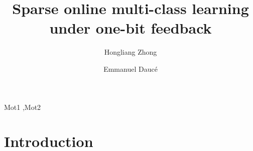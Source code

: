 \documentclass[preprint,12pt,authoryear]{elsarticle}
\begin{document}
\begin{frontmatter}



\title{Sparse online multi-class learning under one-bit feedback}


\author[centrale,lif]{Hongliang Zhong}
\author[centrale,ins]{Emmanuel Dauc\'e }

\address[centrale]{Ecole Centrale de Marseille}
\address[lif]{Laboratoire d'informatique Fondamentale}
\address[ins]{Institut de Neurosciences des Syst\`emes}


\begin{abstract}

\end{abstract}

\begin{keyword}
Mot1 \sep Mot2


\end{keyword}

\end{frontmatter}


\section{Introduction}
\label{sec:lentete}
\end{document}

